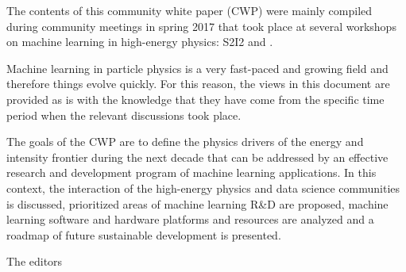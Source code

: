 The contents of this community white paper (CWP) were mainly compiled during community meetings in spring 2017 that took place at several workshops on machine learning in high-energy physics: S2I2 and \cite{DSatHEP2017,IML2017,ACAT2017,HSF2017}.

Machine learning in particle physics is a very fast-paced and growing field and therefore things evolve quickly. For this reason, the views in this document are provided as is with the knowledge that they have come from the specific time period when the relevant discussions took place.

The goals of the CWP are to define the physics drivers of the energy and intensity frontier during the next decade that can be addressed by an effective research and development program of machine learning applications. In this context, the interaction of the high-energy physics and data science communities is discussed, prioritized areas of machine learning R\&D are proposed, machine learning software and hardware platforms and resources are analyzed and a roadmap of future sustainable development is presented.

\bigskip

The editors
